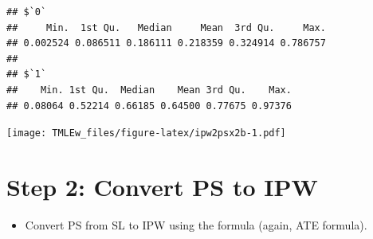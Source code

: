 \documentclass[
]{book}
\newenvironment{Shaded}{\begin{snugshade}}{\end{snugshade}}
\newcommand{\AttributeTok}[1]{\textcolor[rgb]{0.77,0.63,0.00}{#1}}
\newcommand{\DecValTok}[1]{\textcolor[rgb]{0.00,0.00,0.81}{#1}}
\newcommand{\FunctionTok}[1]{\textcolor[rgb]{0.00,0.00,0.00}{#1}}
\newcommand{\NormalTok}[1]{#1}
\newcommand{\SpecialCharTok}[1]{\textcolor[rgb]{0.00,0.00,0.00}{#1}}
\newcommand{\StringTok}[1]{\textcolor[rgb]{0.31,0.60,0.02}{#1}}
\providecommand{\tightlist}{%
  \setlength{\itemsep}{0pt}\setlength{\parskip}{0pt}}
\begin{document}
\begin{Shaded}
\end{Shaded}

\begin{verbatim}
## $`0`
##     Min.  1st Qu.   Median     Mean  3rd Qu.     Max. 
## 0.002524 0.086511 0.186111 0.218359 0.324914 0.786757 
## 
## $`1`
##    Min. 1st Qu.  Median    Mean 3rd Qu.    Max. 
## 0.08064 0.52214 0.66185 0.64500 0.77675 0.97376
\end{verbatim}

\begin{Shaded}
\end{Shaded}

\texttt{[image: TMLEw\_files/figure-latex/ipw2psx2b-1.pdf]}

\hypertarget{step-2-convert-ps-to-ipw-1}{%
\section{Step 2: Convert PS to IPW}\label{step-2-convert-ps-to-ipw-1}}

\begin{itemize}
\tightlist
\item
  Convert PS from SL to IPW using the formula (again, ATE formula).
\end{itemize}
\end{document}
